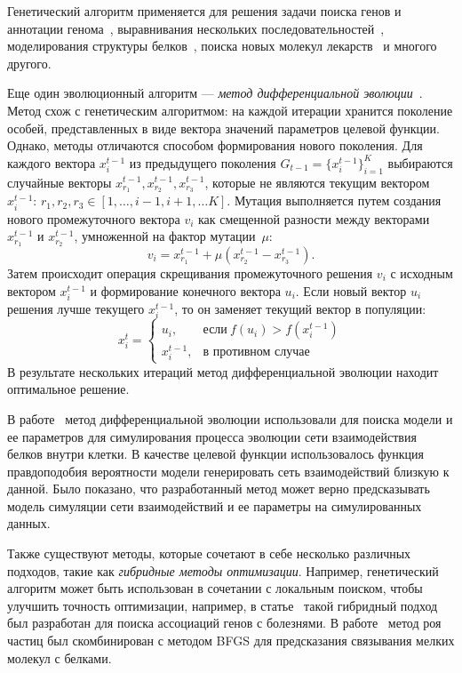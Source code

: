 Генетический алгоритм применяется для решения задачи поиска генов и аннотации генома~\cite{chowdhury2017optimized}, выравнивания нескольких последовательностей~\cite{chowdhury2017review}, моделирования структуры белков~\cite{unger2004genetic}, поиска новых молекул лекарств~\cite{spiegel2020autogrow4} и многого другого. 

Еще один эволюционный алгоритм --- \emph{метод дифференциальной эволюции}~\cite{storn1997differential,}. 
Метод схож с генетическим алгоритмом: на каждой итерации хранится поколение особей, представленных в виде вектора значений параметров целевой функции.
Однако, методы отличаются способом формирования нового поколения.
Для каждого вектора $x^{t-1}_i$ из предыдущего поколения $G_{t-1} = \{x^{t-1}_i\}_{i=1}^K$ выбираются случайные векторы $x^{t-1}_{r_1}, x^{t-1}_{r_2}, x^{t-1}_{r_3}$, которые не являются текущим вектором $x^{t-1}_i$: $r_1, r_2, r_3 \in [1, \dots, i-1, i+1, \dots K]$.
Мутация выполняется путем создания нового промежуточного вектора $v_i$ как смещенной разности между векторами $x^{t-1}_{r_1}$ и $x^{t-1}_{r_2}$, умноженной на фактор мутации~$\mu$:
$$v_i = x^{t-1}_{r_1} + \mu (x^{t-1}_{r_2} - x^{t-1}_{r_3}).$$
Затем происходит операция скрещивания промежуточного решения $v_i$ с исходным вектором $x^{t-1}_i$ и формирование конечного вектора $u_i$.
Если новый вектор $u_i$ решения лучше текущего $x^{t-1}_i$, то он заменяет текущий вектор в популяции:
\begin{equation*}
    x^t_i=
    \begin{cases}
      u_i, & \text{если}\ f(u_i) > f(x^{t-1}_i) \\
      x^{t-1}_i, & \text{в противном случае}
    \end{cases}
\end{equation*}
В результате нескольких итераций метод дифференциальной эволюции находит оптимальное решение.

В работе~\cite{huang2014evolutionary} метод дифференциальной эволюции использовали для поиска модели и ее параметров для симулирования процесса эволюции сети взаимодействия белков внутри клетки.
В качестве целевой функции использовалось функция правдоподобия вероятности модели генерировать сеть взаимодействий близкую к данной.
Было показано, что разработанный метод может верно предсказывать модель симуляции сети взаимодействий и ее параметры на симулированных данных.

Также существуют методы, которые сочетают в себе несколько различных подходов, такие как \emph{гибридные методы оптимизации}.
Например, генетический алгоритм может быть использован в сочетании с локальным поиском, чтобы улучшить точность оптимизации, например, в статье~\cite{yang2016genetic} такой гибридный подход был разработан для поиска ассоциаций генов с болезнями.
В работе~\cite{ng2015psovina} метод роя частиц был скомбинирован с методом BFGS для предсказания связывания мелких молекул с белками.

